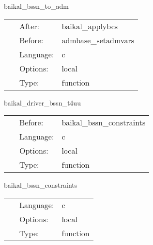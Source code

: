 \vspace{5mm}


\hspace{5mm} baikal\_bssn\_to\_adm 

\hspace{5mm}{\it perform bssn-to-adm conversion. useful for diagnostics. } 


\hspace{5mm}

 \begin{tabular*}{160mm}{cll} 
~ & After:  & baikal\_applybcs \\ 
~ & Before:  & admbase\_setadmvars \\ 
~ & Language:  & c \\ 
~ & Options:  & local \\ 
~ & Type:  & function \\ 
\end{tabular*} 


\vspace{5mm}


\hspace{5mm} baikal\_driver\_bssn\_t4uu 

\hspace{5mm}{\it mol\_pseudoevolution: compute t4uu, needed for bssn constraints } 


\hspace{5mm}

 \begin{tabular*}{160mm}{cll} 
~ & Before:  & baikal\_bssn\_constraints \\ 
~ & Language:  & c \\ 
~ & Options:  & local \\ 
~ & Type:  & function \\ 
\end{tabular*} 


\vspace{5mm}


\hspace{5mm} baikal\_bssn\_constraints 

\hspace{5mm}{\it compute bssn (hamiltonian and momentum) constraints } 


\hspace{5mm}

 \begin{tabular*}{160mm}{cll} 
~ & Language:  & c \\ 
~ & Options:  & local \\ 
~ & Type:  & function \\ 
\end{tabular*} 



